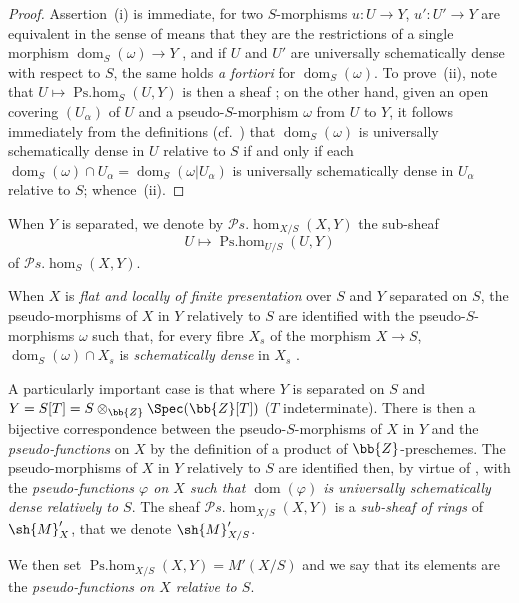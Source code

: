 \begin{proof}
Assertion~(i) is immediate, for two $S$-morphisms $u:U\to Y$, $u':U'\to Y$ are equivalent in the sense of  means that they are the restrictions of a single morphism $\operatorname{dom}_S(\omega)\to Y$ , and if $U$ and $U'$ are universally schematically dense with respect to $S$, the same holds \emph{a fortiori} for $\operatorname{dom}_S(\omega)$.
To prove~(ii), note that $U\mapsto\operatorname{Ps.hom}_S(U,Y)$ is then a sheaf ;
on the other hand, given an open covering $(U_\alpha)$ of $U$ and a pseudo-$S$-morphism $\omega$ from $U$ to $Y$, it follows immediately from the definitions (cf.\ ) that $\operatorname{dom}_S(\omega)$ is universally schematically dense in $U$ relative to $S$ if and only if each $\operatorname{dom}_S(\omega)\cap U_\alpha=\operatorname{dom}_S(\omega|U_\alpha)$ is universally schematically dense in $U_\alpha$ relative to $S$;
whence~(ii).
\end{proof}

When $Y$ is separated, we denote by $\mathscr{P}\!s.\!\operatorname{hom}_{X/S}(X,Y)$ the sub-sheaf
\[
  U\mapsto\operatorname{Ps.hom}_{U/S}(U,Y)
\]
of $\mathscr{P}\!s.\!\operatorname{hom}_S(X,Y)$.

When $X$ is \emph{flat and locally of finite presentation} over $S$ and $Y$ separated on $S$, the pseudo-morphisms of $X$ in $Y$ relatively to $S$ are identified with the pseudo-$S$-morphisms $\omega$ such that, for every fibre $X_s$ of the morphism $X\to S$, $\operatorname{dom}_S(\omega)\cap X_s$ is \emph{schematically dense} in $X_s$ .

\begin{env}[20.5.4]
\label{IV.20.5.4}
A particularly important case is that where $Y$ is separated on $S$ and $Y=S[T]=S\otimes_{\bb{Z}}\Spec(\bb{Z}[T])$ ($T$ indeterminate).
There is then a bijective correspondence between the pseudo-$S$-morphisms of $X$ in $Y$ and the \emph{pseudo-functions} on $X$  by the definition of a product of $\bb{Z}$-preschemes.
The pseudo-morphisms of $X$ in $Y$ relatively to $S$ are identified then, by virtue of , with the \emph{pseudo-functions $\varphi$ on $X$ such that $\operatorname{dom}(\varphi)$ is universally schematically dense relatively to $S$}.
The sheaf $\mathscr{P}\!s.\!\operatorname{hom}_{X/S}(X,Y)$ is a \emph{sub-sheaf of rings} of $\sh{M}'_X$, that we denote $\sh{M}'_{X/S}$.

We then set $\operatorname{Ps.hom}_{X/S}(X,Y)=M'(X/S)$ and we say that its elements are the \emph{pseudo-functions on $X$ relative to $S$}.
\end{env}

